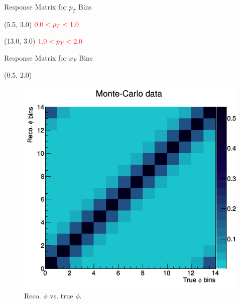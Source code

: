 \documentclass[10pt, xcolor={dvipsnames}, aspectratio = 169]{beamer}
\begin{document}
\begin{frame}{Response Matrix for $p_{T}$ Bins}
\begin{textblock}{3.0}(5.5, 3.0)
$\color{red} 0.0 < p_{T} < 1.0$
\end{textblock}

\begin{textblock}{3.0}(13.0, 3.0)
$\color{red} 1.0 < p_{T} < 2.0$
\end{textblock}

\end{frame}

\begin{frame}{Response Matrix for $x_{F}$ Bins}

\begin{textblock}{7.0}(0.5, 2.0)
\begin{figure}
    \centering
    \includegraphics[width = 1.0\linewidth]{imgs/matrix_xf0.png}
    \caption{Reco. $\phi$ vs. true $\phi$.}
\end{figure}
\end{textblock}


\end{frame}
\end{document}
